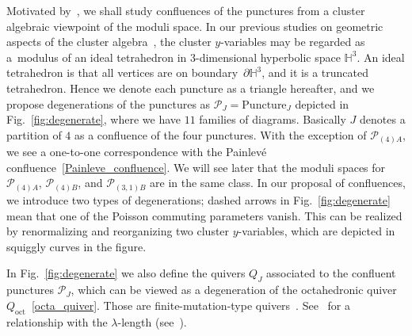\documentclass[pdftex]{sigma}
\numberwithin{equation}{section}
\begin{document}
Motivated by~\cite{ChekMazzRubt15a,ChekMazzRubt17a}, we shall study confluences of the punctures from a cluster algebraic viewpoint of the moduli space. In our previous studies on geometric aspects of the cluster algebra~\cite{HikamiRInoue12a}, the cluster $y$-variables may be regarded as a~modulus of an ideal tetrahedron in 3-dimensional hyperbolic space $\mathbb{H}^3$. An ideal tetrahedron is that
all vertices are on boundary~$\partial \mathbb{H}^3$, and it is a truncated tetrahedron. Hence we denote each puncture as a triangle hereafter, and we propose degenerations of the punctures as $\mathcal{P}_J=\text{Puncture}_J$ depicted in Fig.~\ref{fig:degenerate}, where we have $11$ families of diagrams. Basically $J$ denotes a partition of $4$ as a confluence of the four punctures. With the exception of $\mathcal{P}_{(4)A}$, we see a one-to-one correspondence with the Painlev{\'e} confluence~\eqref{Painleve_confluence}. We will see later that the moduli spaces for $\mathcal{P}_{(4)A}$, $\mathcal{P}_{(4)B}$, and $\mathcal{P}_{(3,1)B}$ are in the same class. In our proposal of confluences, we introduce two types of degenerations; dashed arrows in Fig.~\ref{fig:degenerate} mean that one of the Poisson commuting parameters vanish. This can be realized by renormalizing and reorganizing two cluster $y$-variables, which are depicted in squiggly curves in the figure.

In Fig.~\ref{fig:degenerate} we also define the quivers $Q_J$ associated to the confluent punctures $\mathcal{P}_J$, which can be viewed as a degeneration of the octahedronic quiver $Q_{\text{oct}}$~\eqref{octa_quiver}. Those are finite-mutation-type quivers~\cite{FomiShapThur08a}. See~\cite{FeliShapTuma12a} for a relationship with the $\lambda$-length (see~\cite{Penner12}).
\end{document}
